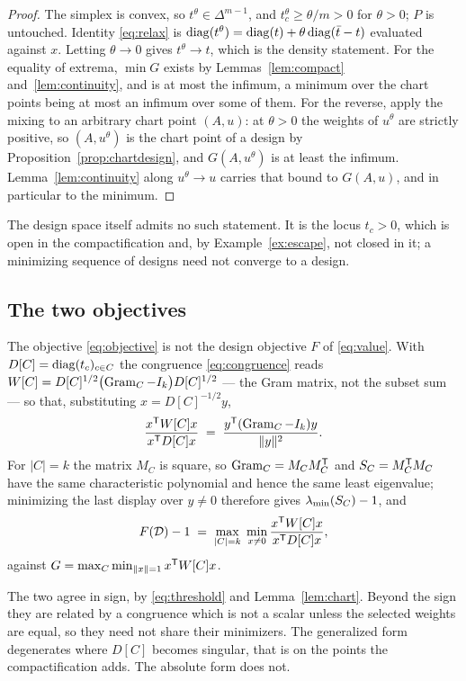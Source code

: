 \begin{proof}
The simplex is convex, so $t^{\theta}\in\Delta^{m-1}$, and
$t^{\theta}_c\ge\theta/m>0$ for $\theta>0$; $P$ is untouched.  Identity
\eqref{eq:relax} is
$\operatorname{diag}(t^{\theta})=\operatorname{diag}(t)+\theta\operatorname{diag}(\bar t-t)$ evaluated against $x$.
Letting $\theta\to0$ gives $t^{\theta}\to t$, which is the density
statement.  For the equality of extrema, $\min G$ exists by
Lemmas~\ref{lem:compact} and~\ref{lem:continuity}, and is at most the
infimum, a minimum over the chart points being at most an infimum over
some of them.  For the reverse, apply the mixing to an arbitrary chart
point $(A,u)$: at $\theta>0$ the weights of $u^{\theta}$ are strictly
positive, so $(A,u^{\theta})$ is the chart point of a design by
Proposition~\ref{prop:chartdesign}, and $G(A,u^{\theta})$ is at least
the infimum.  Lemma~\ref{lem:continuity} along $u^{\theta}\to u$ carries
that bound to $G(A,u)$, and in particular to the minimum.
\end{proof}

The design space itself admits no such statement.  It is the locus
$t_c>0$, which is open in the compactification and, by
Example~\ref{ex:escape}, not closed in it; a minimizing sequence of
designs need not converge to a design.

\subsection{The two objectives}\label{sec:objectives}

The objective \eqref{eq:objective} is not the design objective $F$ of
\eqref{eq:value}.  With
$D[C]=\operatorname{diag}(t_c)_{c\in C}$ the congruence \eqref{eq:congruence} reads
$W[C]=D[C]^{1/2}\bigl(\operatorname{Gram}_C-I_k\bigr)D[C]^{1/2}$ --- the Gram matrix,
not the subset sum --- so that, substituting $x=D[C]^{-1/2}y$,
\[
  \frac{x^{\mathsf{T}} W[C]x}{x^{\mathsf{T}} D[C]x}
  \;=\;\frac{y^{\mathsf{T}}(\operatorname{Gram}_C-I_k)y}{\lVert y\rVert^{2}} .
\]
For $\lvert C\rvert=k$ the matrix $M_C$ is square, so $\operatorname{Gram}_C=M_CM_C^{\mathsf{T}}$
and $S_{C}=M_C^{\mathsf{T}} M_C$ have the same characteristic polynomial and hence the
same least eigenvalue; minimizing the last display over $y\ne0$ therefore
gives $\lambda_{\min}(S_{C})-1$, and
\[
  F(\mathcal{D})-1\;=\;\max_{\lvert C\rvert=k}\;\min_{x\ne0}
    \frac{x^{\mathsf{T}} W[C]x}{x^{\mathsf{T}} D[C]x},
\]
against $G=\max_C\min_{\lVert x\rVert=1}x^{\mathsf{T}} W[C]x$.

\begin{remark}\label{rem:objectives}
The two agree in sign, by \eqref{eq:threshold} and
Lemma~\ref{lem:chart}.  Beyond the sign they are related by a congruence
which is not a scalar unless the selected weights are equal, so they
need not share their minimizers.  The generalized form degenerates where
$D[C]$ becomes singular, that is on the points the compactification adds.
The absolute form does not.
\end{remark}

